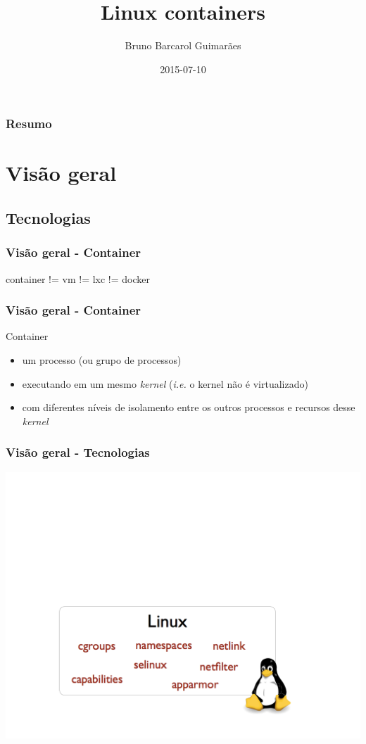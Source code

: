 \documentclass{beamer}
\title[Linux containers]{Linux containers}
\author{Bruno Barcarol Guimarães}
\institute[]{\textit{bbgstb@gmail.com}}
\date{2015-07-10}
\begin{document}
\begin{frame}
    \titlepage
\end{frame}

\begin{frame}
    \frametitle{Resumo}
    \tableofcontents
\end{frame}

\section{Visão geral}

\subsection{Tecnologias}

\begin{frame}
    \frametitle{Visão geral - Container}
    container != vm != lxc != docker
\end{frame}

\begin{frame}
    \frametitle{Visão geral - Container}
    Container
    \begin{itemize}
        \item um processo (ou grupo de processos)
        \item executando em um mesmo \textit{kernel} (\textit{i.e.} o kernel
        não é virtualizado)
        \item com diferentes níveis de isolamento entre os outros processos e
        recursos desse \textit{kernel}
    \end{itemize}
\end{frame}

\begin{frame}
    \frametitle{Visão geral - Tecnologias}
    \centering
    \includegraphics[width=1\linewidth]{img/docker_diagram_kernel.png}
\end{frame}
\end{document}
